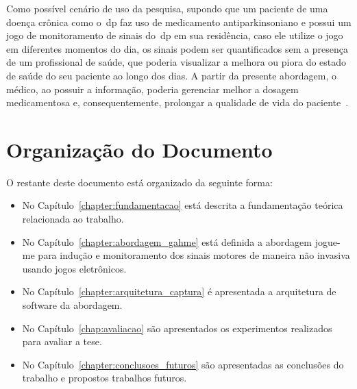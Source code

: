 Como possível cenário de uso da pesquisa, supondo que um paciente de uma doença crônica como o~\ac{dp} faz uso de medicamento antiparkinsoniano e possui um jogo de monitoramento de sinais do~\ac{dp} em sua residência, caso ele utilize o jogo em diferentes momentos do dia, os sinais podem ser quantificados sem a presença de um profissional de saúde, que poderia visualizar a melhora ou piora do estado de saúde do seu paciente ao longo dos dias. A partir da presente abordagem, o médico, ao possuir a informação, poderia gerenciar melhor a dosagem medicamentosa e, consequentemente, prolongar a qualidade de vida do paciente~\cite{abn2010}.

%
%




\section{Organização do Documento}
O restante deste documento está organizado da seguinte forma:
\begin{itemize}
	\item No Capítulo~\ref{chapter:fundamentacao} está descrita a fundamentação teórica relacionada ao trabalho.
	\item No Capítulo~\ref{chapter:abordagem_gahme} está definida a abordagem \ac{jogue-me} para indução e monitoramento dos sinais motores de maneira não invasiva usando jogos eletrônicos.
	\item No Capítulo~\ref{chapter:arquitetura_captura} é apresentada a arquitetura de software da abordagem.
	\item No Capítulo~\ref{chap:avaliacao} são apresentados os experimentos realizados para avaliar a tese.
	\item No Capítulo~\ref{chapter:conclusoes_futuros} são apresentadas as conclusões do trabalho e propostos trabalhos futuros.
\end{itemize}
